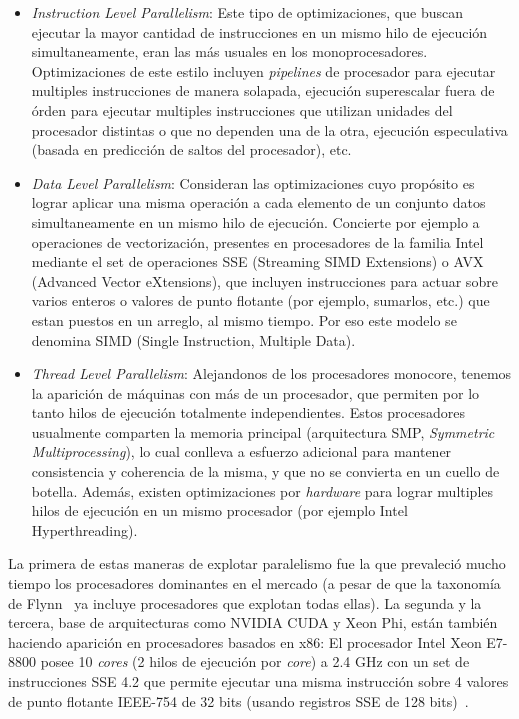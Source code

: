 \begin{itemize}
    \item \textit{Instruction Level Parallelism}: Este tipo de optimizaciones, que buscan
    ejecutar la mayor cantidad de instrucciones en un mismo hilo de ejecuci\'on simultaneamente,
    eran las m\'as usuales en los monoprocesadores. Optimizaciones de este estilo incluyen
    \textit{pipelines} de procesador para ejecutar multiples instrucciones de manera solapada,
    ejecuci\'on superescalar fuera de \'orden para ejecutar multiples instrucciones que 
    utilizan unidades del procesador distintas o que no dependen una de la otra, ejecuci\'on
    especulativa (basada en predicci\'on de saltos del procesador), etc. 

    \item \textit{Data Level Parallelism}: Consideran las optimizaciones cuyo prop\'osito es
    lograr aplicar una misma operaci\'on a cada elemento de un conjunto datos simultaneamente 
    en un mismo hilo de ejecuci\'on. Concierte por ejemplo a operaciones de vectorizaci\'on, 
    presentes en procesadores de la familia Intel mediante el set de operaciones SSE 
    (Streaming SIMD Extensions) o AVX (Advanced Vector eXtensions), que incluyen instrucciones
    para actuar sobre varios enteros o valores de punto flotante (por ejemplo, sumarlos, etc.)
    que estan puestos en un arreglo, al mismo tiempo. Por eso este modelo se denomina SIMD
    (Single Instruction, Multiple Data).

    \item \textit{Thread Level Parallelism}: Alejandonos de los procesadores monocore, tenemos
    la aparici\'on de m\'aquinas con m\'as de un procesador, que permiten por lo tanto hilos
    de ejecuci\'on totalmente independientes. Estos procesadores usualmente
    comparten la memoria principal (arquitectura SMP, \textit{Symmetric Multiprocessing}), lo
    cual conlleva a esfuerzo adicional para mantener consistencia y coherencia de la misma, y
    que no se convierta en un cuello de botella.  Adem\'as, existen optimizaciones por 
    \textit{hardware} para lograr multiples hilos de ejecuci\'on en un mismo procesador
    (por ejemplo Intel Hyperthreading).
\end{itemize}

La primera de estas maneras de explotar paralelismo fue la que prevaleci\'o mucho tiempo los
procesadores dominantes en el mercado (a pesar de que la taxonom\'ia de Flynn~\cite{HennessyPatterson} ya incluye 
procesadores que explotan todas ellas). La segunda y la tercera, base de arquitecturas como NVIDIA CUDA y Xeon Phi, 
est\'an tambi\'en haciendo aparici\'on en procesadores basados en x86: El procesador Intel Xeon E7-8800 posee 10 \textit{cores}
(2 hilos de ejecuci\'on por \textit{core}) a 2.4 GHz con un set de instrucciones SSE 4.2 que permite ejecutar una misma instrucci\'on
sobre 4 valores de punto flotante IEEE-754 de 32 bits (usando registros SSE de 128 bits)~\cite{XeonE78800Spec}. 

